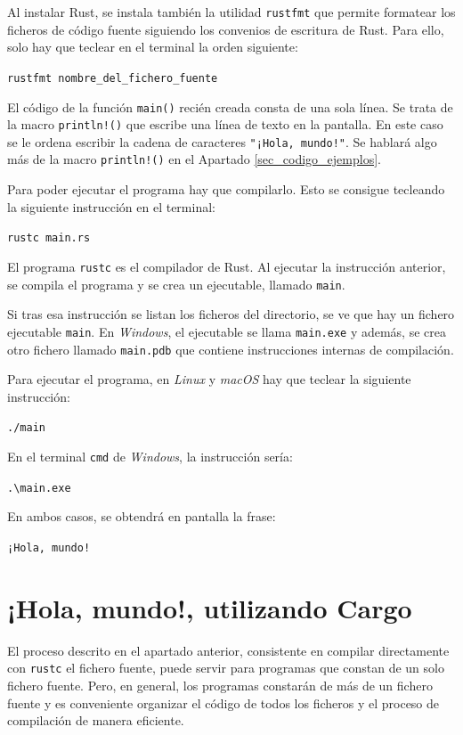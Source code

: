 Al instalar Rust, se instala también la utilidad \texttt{rustfmt} que permite formatear los ficheros de código fuente siguiendo los convenios de escritura de Rust. Para ello, solo hay que teclear en el terminal la orden siguiente:

{\centering\texttt{rustfmt nombre\_del\_fichero\_fuente}\par}

El código de la función \texttt{main()} recién creada consta de una sola línea. Se trata de la macro \texttt{println!()} que escribe una línea de texto en la pantalla. En este caso se le ordena escribir la cadena de caracteres \texttt{"¡Hola, mundo!"}. Se hablará algo más de la macro \texttt{println!()} en el Apartado \ref{sec_codigo_ejemplos}.

Para poder ejecutar el programa hay que compilarlo. Esto se consigue tecleando la siguiente instrucción en el terminal:

\vspace{0.2em}
{\centering\texttt{rustc main.rs}\par}

El programa \texttt{rustc} es el compilador de Rust. Al ejecutar la instrucción anterior, se compila el programa y se crea un ejecutable, llamado \texttt{main}. 

\pagebreak

Si tras esa instrucción se listan los ficheros del directorio, se ve que hay un fichero ejecutable \texttt{main}. En \textit{Windows}, el ejecutable se llama \texttt{main.exe} y además, se crea otro fichero llamado \texttt{main.pdb} que contiene instrucciones internas de compilación.

Para ejecutar el programa, en \textit{Linux} y \textit{macOS} hay que teclear la siguiente instrucción:

\vspace{0.2em}
{\centering\texttt{./main}\par}

\vspace{0.2em}
En el terminal \texttt{cmd} de \textit{Windows}, la instrucción sería:

{\centering\texttt{.\textbackslash main.exe}\par}

En ambos casos, se obtendrá en pantalla la frase:

{\centering\texttt{¡Hola, mundo!}\par}

\section{¡Hola, mundo!, utilizando Cargo}
\label{sec_cargo}
\noindent El proceso descrito en el apartado anterior, consistente en compilar directamente con \texttt{rustc} el fichero fuente, puede servir para programas que constan de un solo fichero fuente. Pero, en general, los programas constarán de más de un fichero fuente y es conveniente organizar el código de todos los ficheros y el proceso de compilación de manera eficiente.

